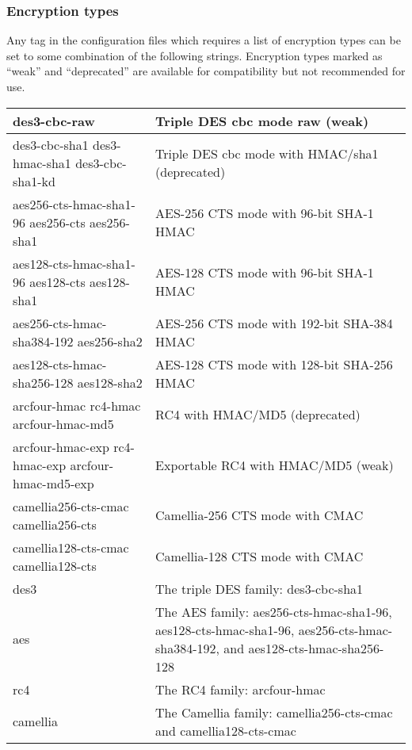 \documentclass[letterpaper,10pt,english]{sphinxmanual}
\begin{document}
\subsubsection{Encryption types}
\label{\detokenize{admin/conf_files/kdc_conf:id6}}\label{\detokenize{admin/conf_files/kdc_conf:encryption-types}}
Any tag in the configuration files which requires a list of encryption
types can be set to some combination of the following strings.
Encryption types marked as “weak” and “deprecated” are available for
compatibility but not recommended for use.


\begin{savenotes}\sphinxattablestart
\centering
\begin{tabulary}{\linewidth}[t]{|T|T|}
\hline

des3-cbc-raw
&
Triple DES cbc mode raw (weak)
\\
\hline
des3-cbc-sha1 des3-hmac-sha1 des3-cbc-sha1-kd
&
Triple DES cbc mode with HMAC/sha1 (deprecated)
\\
\hline
aes256-cts-hmac-sha1-96 aes256-cts aes256-sha1
&
AES-256 CTS mode with 96-bit SHA-1 HMAC
\\
\hline
aes128-cts-hmac-sha1-96 aes128-cts aes128-sha1
&
AES-128 CTS mode with 96-bit SHA-1 HMAC
\\
\hline
aes256-cts-hmac-sha384-192 aes256-sha2
&
AES-256 CTS mode with 192-bit SHA-384 HMAC
\\
\hline
aes128-cts-hmac-sha256-128 aes128-sha2
&
AES-128 CTS mode with 128-bit SHA-256 HMAC
\\
\hline
arcfour-hmac rc4-hmac arcfour-hmac-md5
&
RC4 with HMAC/MD5 (deprecated)
\\
\hline
arcfour-hmac-exp rc4-hmac-exp arcfour-hmac-md5-exp
&
Exportable RC4 with HMAC/MD5 (weak)
\\
\hline
camellia256-cts-cmac camellia256-cts
&
Camellia-256 CTS mode with CMAC
\\
\hline
camellia128-cts-cmac camellia128-cts
&
Camellia-128 CTS mode with CMAC
\\
\hline
des3
&
The triple DES family: des3-cbc-sha1
\\
\hline
aes
&
The AES family: aes256-cts-hmac-sha1-96, aes128-cts-hmac-sha1-96, aes256-cts-hmac-sha384-192, and aes128-cts-hmac-sha256-128
\\
\hline
rc4
&
The RC4 family: arcfour-hmac
\\
\hline
camellia
&
The Camellia family: camellia256-cts-cmac and camellia128-cts-cmac
\\
\hline
\end{tabulary}
\par
\sphinxattableend\end{savenotes}
\end{document}
